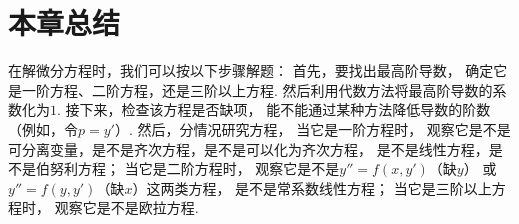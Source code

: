\section{本章总结}
在解微分方程时，我们可以按以下步骤解题：
首先，要找出最高阶导数，
确定它是一阶方程、二阶方程，还是三阶以上方程.
然后利用代数方法将最高阶导数的系数化为\(1\).
接下来，检查该方程是否缺项，
能不能通过某种方法降低导数的阶数（例如，令\(p = y'\)）.
然后，分情况研究方程，
当它是一阶方程时，
观察它是不是可分离变量，是不是齐次方程，是不是可以化为齐次方程，
是不是线性方程，是不是伯努利方程；
当它是二阶方程时，
观察它是不是\(y'' = f(x,y')\)（缺\(y\)）
或\(y'' = f(y,y')\)（缺\(x\)）这两类方程，
是不是常系数线性方程；
当它是三阶以上方程时，
观察它是不是欧拉方程.

